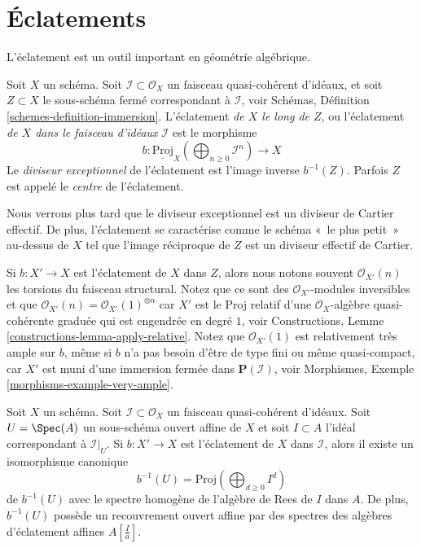 \section{Éclatements}
\label{section-blowing-up}

\noindent
L'éclatement est un outil important en géométrie algébrique.

\begin{definition}
\label{definition-blow-up}
Soit  $X$  un schéma. Soit  $\mathcal{I} \subset \mathcal{O}_X$  un faisceau quasi-cohérent
d'idéaux, et soit  $Z \subset X$  le sous-schéma fermé correspondant à  $\mathcal{I}$,
voir Schémas, Définition  \ref{schemes-definition-immersion}. L'éclatement  {\it  de
 $X$  le long de  $Z$}, ou l'éclatement
 {\it  de  $X$  dans le faisceau d'idéaux
 $\mathcal{I}$}  est le morphisme
$$
b :
\underline{\text{Proj}}_X
\left(\bigoplus\nolimits_{n \geq 0} \mathcal{I}^n\right)
\longrightarrow
X
$$
Le  {\it diviseur exceptionnel} de l'éclatement est
l'image inverse $b^{-1}(Z)$. Parfois  $Z$  est appelé le
 {\it centre}  de l'éclatement.
\end{definition}

\noindent
Nous verrons plus tard que le diviseur exceptionnel est un diviseur de Cartier
effectif. De plus, l'éclatement se caractérise comme le schéma « le plus petit »
au-dessus de $X$ tel que l'image réciproque de $Z$ est un diviseur
effectif de Cartier.

\medskip\noindent
Si  $b : X' \to X$  est l’éclatement de  $X$  dans  $Z$, alors nous
notons souvent  $\mathcal{O}_{X'}(n)$  les torsions du faisceau structural. Notez que ce sont
des  $\mathcal{O}_{X'}$-modules inversibles et que  $\mathcal{O}_{X'}(n) = \mathcal{O}_{X'}(1)^{\otimes n}$  car  $X'$  est le
Proj relatif d’une  $\mathcal{O}_X$-algèbre quasi-cohérente graduée qui est engendrée
en degré  $1$, voir Constructions, Lemme  \ref{constructions-lemma-apply-relative}. Notez que
 $\mathcal{O}_{X'}(1)$  est relativement très ample sur  $b$, même si  $b$ 
n’a pas besoin d’être de type fini ou même quasi-compact, car  $X'$  est
muni d’une immersion fermée dans  $\mathbf{P}(\mathcal{I})$, voir Morphismes, Exemple
 \ref{morphisms-example-very-ample}.

\begin{lemma}
\label{lemma-blowing-up-affine}
Soit  $X$  un schéma. Soit  $\mathcal{I} \subset \mathcal{O}_X$  un faisceau quasi-cohérent
d'idéaux. Soit  $U = \Spec(A)$  un sous-schéma ouvert affine de  $X$  et soit
 $I \subset A$  l'idéal correspondant à  $\mathcal{I}|_U$. Si  $b : X' \to X$  est
l'éclatement de  $X$  dans  $\mathcal{I}$, alors il existe un isomorphisme
canonique
$$
b^{-1}(U) = \text{Proj}(\bigoplus\nolimits_{d \geq 0} I^d)
$$
de  $b^{-1}(U)$  avec le spectre homogène de l'algèbre de Rees de  $I$  dans
 $A$. De plus,  $b^{-1}(U)$  possède un recouvrement ouvert affine par des
spectres des algèbres d'éclatement affines  $A[\frac{I}{a}]$.
\end{lemma}

